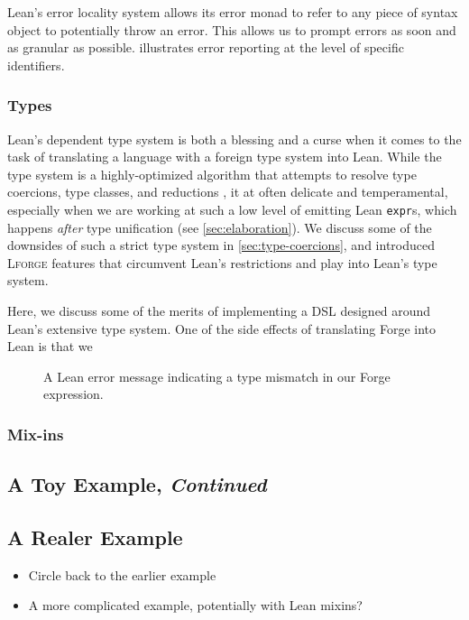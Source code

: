 Lean's error locality system allows its error monad to refer to any piece of syntax object to potentially throw an error. This allows us to prompt errors as soon and as granular as possible.  illustrates error reporting at the level of specific identifiers. 

\subsubsection{Types}

Lean's dependent type system is both a blessing and a curse when it comes to the task of translating a language with a foreign type system into Lean. While the type system is a highly-optimized algorithm that attempts to resolve type coercions, type classes, and reductions \cite{de2015lean}, it at often delicate and temperamental, especially when we are working at such a low level of emitting Lean \texttt{expr}s, which happens \emph{after} type unification (see \cref{sec:elaboration}). We discuss some of the downsides of such a strict type system in \cref{sec:type-coercions}, and introduced \textsc{Lforge} features that circumvent Lean's restrictions and play into Lean's type system. 

Here, we discuss some of the merits of implementing a DSL designed around Lean's extensive type system. One of the side effects of translating Forge into Lean is that we 

\begin{figure}
  \centering
  \caption{A Lean error message indicating a type mismatch in our Forge expression.}
  \label{fig:sc-type-mismatch}
\end{figure}

\subsubsection{Mix-ins}

\subsection{A Toy Example, \emph{Continued}}

\subsection{A Realer Example}

\begin{itemize}
  \item Circle back to the earlier example
  \item A more complicated example, potentially with Lean mixins?
\end{itemize}

